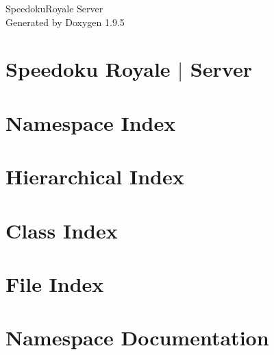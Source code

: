 \documentclass[twoside]{book}
\newcommand{\+}{\discretionary{\mbox{\scriptsize$\hookleftarrow$}}{}{}}
\newcommand{\clearemptydoublepage}{%
    \newpage{\pagestyle{empty}\cleardoublepage}%
  }
\begin{document}
  \raggedbottom
    \hypersetup{pageanchor=false,
                bookmarksnumbered=true,
                pdfencoding=unicode
               }
  \begin{titlepage}
  \vspace*{7cm}
  \begin{center}%
  {\Large Speedoku\+Royale Server}\\
  \vspace*{1cm}
  {\large Generated by Doxygen 1.9.5}\\
  \end{center}
  \end{titlepage}
  \clearemptydoublepage
  \tableofcontents
  \clearemptydoublepage
  \hypersetup{pageanchor=true}
\chapter{Speedoku Royale $\vert$ Server}
\label{md__speedoku_royale_server__r_e_a_d_m_e}

\chapter{Namespace Index}

\chapter{Hierarchical Index}

\chapter{Class Index}

\chapter{File Index}

\chapter{Namespace Documentation}


\end{document}
